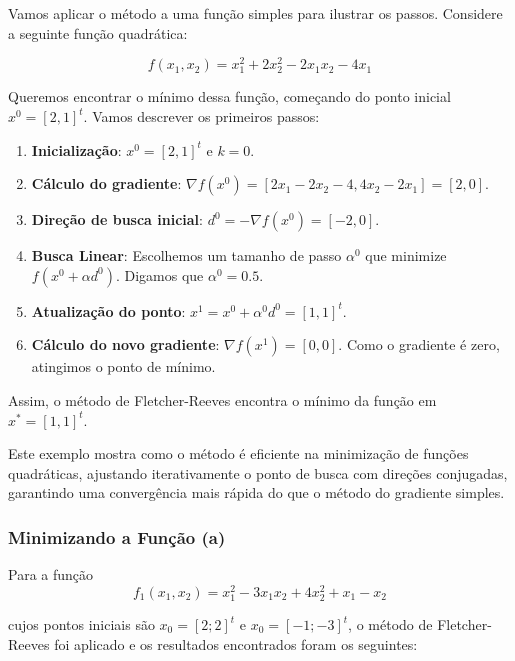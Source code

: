 \documentclass[a4paper, 12pt]{article}
\begin{document}
Vamos aplicar o método a uma função simples para ilustrar os passos. Considere a seguinte função quadrática:

\[
f(x_1, x_2) = x_1^2 + 2x_2^2 - 2x_1x_2 - 4x_1
\]

Queremos encontrar o mínimo dessa função, começando do ponto inicial $x^0 = [2, 1]^t$. Vamos descrever os primeiros passos:

\begin{enumerate}
    \item \textbf{Inicialização}: $x^0 = [2, 1]^t$ e $k = 0$.
    \item \textbf{Cálculo do gradiente}: $\nabla f(x^0) = [2x_1 - 2x_2 - 4, 4x_2 - 2x_1] = [2, 0]$.
    \item \textbf{Direção de busca inicial}: $d^0 = -\nabla f(x^0) = [-2, 0]$.
    \item \textbf{Busca Linear}: Escolhemos um tamanho de passo $\alpha^0$ que minimize $f(x^0 + \alpha d^0)$. Digamos que $\alpha^0 = 0.5$.
    \item \textbf{Atualização do ponto}: $x^1 = x^0 + \alpha^0 d^0 = [1, 1]^t$.
    \item \textbf{Cálculo do novo gradiente}: $\nabla f(x^1) = [0, 0]$. Como o gradiente é zero, atingimos o ponto de mínimo.
\end{enumerate}

Assim, o método de Fletcher-Reeves encontra o mínimo da função em $x^* = [1, 1]^t$.

Este exemplo mostra como o método é eficiente na minimização de funções quadráticas, ajustando iterativamente o ponto de busca com direções conjugadas, garantindo uma convergência mais rápida do que o método do gradiente simples.


\subsubsection{Minimizando a Função (a)}

Para a função 
\[
f_1(x_1, x_2) = x_1^2 - 3x_1x_2 + 4x_2^2 + x_1 - x_2
\]

cujos pontos iniciais são $x_0 = [2; 2]^t$ e $x_0 = [-1; -3]^t$, o método de Fletcher-Reeves foi aplicado e os resultados encontrados foram os seguintes:
\end{document}
